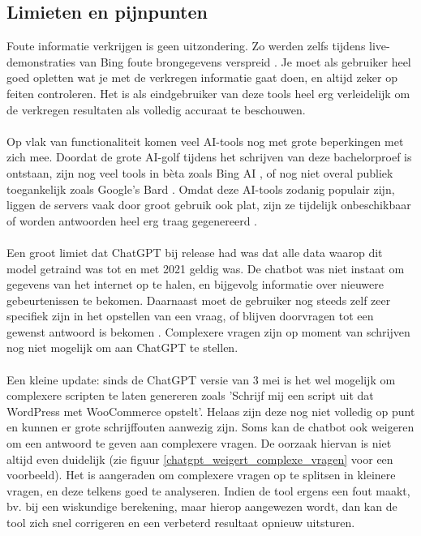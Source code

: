 \subsection{Limieten en pijnpunten}
Foute informatie verkrijgen is geen uitzondering. Zo werden zelfs tijdens live-demonstraties van Bing foute brongegevens verspreid \autocite{Bellens2023}. Je moet als gebruiker heel goed opletten wat je met de verkregen informatie gaat doen, en altijd zeker op feiten controleren. Het is als eindgebruiker van deze tools heel erg verleidelijk om de verkregen resultaten als volledig accuraat te beschouwen.
\\\\
Op vlak van functionaliteit komen veel AI-tools nog met grote beperkingen met zich mee. Doordat de grote AI-golf tijdens het schrijven van deze bachelorproef is ontstaan, zijn nog veel tools in bèta zoals Bing AI \autocite{Dent2023}, of nog niet overal publiek toegankelijk zoals Google's Bard \autocite{Dawes2023}. Omdat deze AI-tools zodanig populair zijn, liggen de servers vaak door groot gebruik ook plat, zijn ze tijdelijk onbeschikbaar of worden antwoorden heel erg traag gegenereerd \autocite{Leong2023}. 
\\\\
Een groot limiet dat ChatGPT bij release had was dat alle data waarop dit model getraind was tot en met 2021 geldig was. De chatbot was niet instaat om gegevens van het internet op te halen, en bijgevolg informatie over nieuwere gebeurtenissen te bekomen. Daarnaast moet de gebruiker nog steeds zelf zeer specifiek zijn in het opstellen van een vraag, of blijven doorvragen tot een gewenst antwoord is bekomen \autocite{Tips2022}. Complexere vragen zijn op moment van schrijven nog niet mogelijk om aan ChatGPT te stellen.
\\\\
Een kleine update: sinds de ChatGPT versie van 3 mei is het wel mogelijk om complexere scripten te laten genereren zoals 'Schrijf mij een script uit dat WordPress met WooCommerce opstelt'. Helaas zijn deze nog niet volledig op punt en kunnen er grote schrijffouten aanwezig zijn. Soms kan de chatbot ook weigeren om een antwoord te geven aan complexere vragen. De oorzaak hiervan is niet altijd even duidelijk (zie figuur \ref{chatgpt_weigert_complexe_vragen} voor een voorbeeld). Het is aangeraden om complexere vragen op te splitsen in kleinere vragen, en deze telkens goed te analyseren. Indien de tool ergens een fout maakt, bv. bij een wiskundige berekening, maar hierop aangewezen wordt, dan kan de tool zich snel corrigeren en een verbeterd resultaat opnieuw uitsturen.
